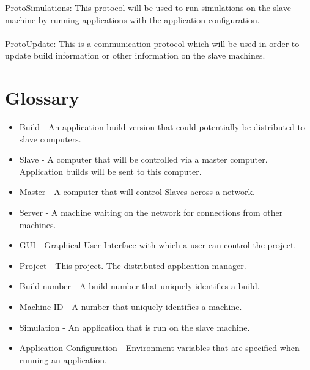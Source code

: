 \documentclass[a4paper,12pt,final]{article}
\begin{document}
ProtoSimulations: This protocol will be used to run simulations on the slave machine by running
applications with the application configuration.\\
\textbf{\\}
ProtoUpdate: This is a communication protocol which will be used in order to update build
information or other information on the slave machines.



\newpage
\section{Glossary}
\begin{itemize}
\item{Build - An application build version that could potentially be distributed to slave computers.}
\item{Slave - A computer that will be controlled via a master computer. Application builds will be sent to this computer.}
\item{Master - A computer that will control Slaves across a network.}
\item{Server - A machine waiting on the network for connections from other machines.}
\item{GUI - Graphical User Interface with which a user can control the project.}
\item{Project - This project. The distributed application manager.}
\item{ Build number -  A build number that uniquely identifies a build.}
\item{ Machine ID -  A number that uniquely identifies a machine.}
\item{Simulation - An application that is run on the slave machine.}
\item{Application Configuration - Environment variables that are specified when running an application.}
\end{itemize}
\end{document}
